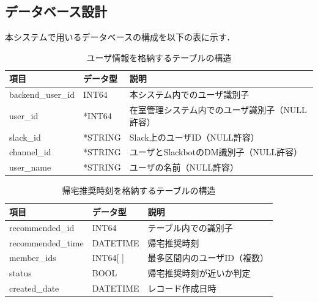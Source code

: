 \subsection{データベース設計} %

本システムで用いるデータベースの構成を以下の表に示す．

\begin{table}[htb]
  \centering
  \caption{ユーザ情報を格納するテーブルの構造}
  \label{tab:user}
  \begin{tabular}{|l|l|l|}
    \hline
    \textbf{項目}       & \textbf{データ型} & \textbf{説明}                \\
    \hline
    backend\_user\_id & INT64         & 本システム内でのユーザ識別子             \\
    user\_id          & *INT64        & 在室管理システム内でのユーザ識別子（NULL許容）  \\
    slack\_id         & *STRING       & Slack上のユーザID（NULL許容）       \\
    channel\_id       & *STRING       & ユーザとSlackbotのDM識別子（NULL許容） \\
    user\_name        & *STRING       & ユーザの名前（NULL許容）             \\
    \hline
  \end{tabular}
\end{table}

\begin{table}[htb]
  \centering
  \caption{帰宅推奨時刻を格納するテーブルの構造}
  \label{tab:recommended}
  \begin{tabular}{|l|l|l|}
    \hline
    \textbf{項目}       & \textbf{データ型} & \textbf{説明}     \\
    \hline
    recommended\_id   & INT64         & テーブル内での識別子      \\
    recommended\_time & DATETIME      & 帰宅推奨時刻          \\
    member\_ids       & INT64[ ]      & 最多区間内のユーザID（複数） \\
    status            & BOOL          & 帰宅推奨時刻が近いか判定    \\
    created\_date     & DATETIME      & レコード作成日時        \\
    \hline
  \end{tabular}
\end{table}

